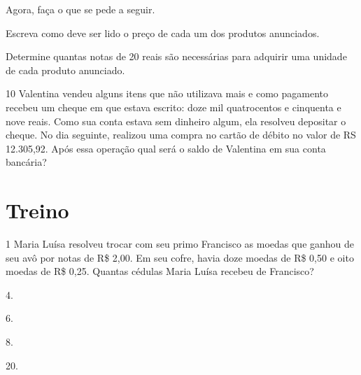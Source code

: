 Agora, faça o que se pede a seguir.

\begin{escolha}
\item
  Escreva como deve ser lido o preço de cada um dos produtos anunciados.


\item
  Determine quantas notas de 20 reais são necessárias para adquirir uma unidade de cada produto anunciado.

\end{escolha}

\num{10} Valentina vendeu alguns itens que não utilizava mais e como pagamento
recebeu um cheque em que estava escrito: doze mil quatrocentos e
cinquenta e nove reais. Como sua conta estava sem dinheiro algum, ela
resolveu depositar o cheque. No dia seguinte, realizou uma compra no
cartão de débito no valor de RS 12.305,92. Após essa operação qual será o
saldo de Valentina em sua conta bancária?

\pagebreak

\section*{Treino}

\num{1} Maria Luísa resolveu trocar com seu primo Francisco as moedas que ganhou de seu avô por notas de R\$ 2,00. Em seu cofre, havia doze moedas de R\$ 0,50
e oito moedas de R\$ 0,25. Quantas cédulas Maria Luísa recebeu de Francisco?

\begin{escolha}
\begin{multicols}{2}
\item
  4.
\item
  6.
\item
  8.
\item
  20.
\end{multicols}
\end{escolha}



